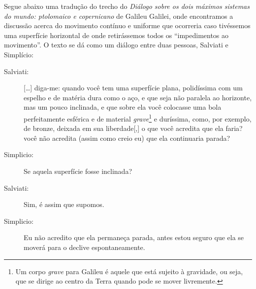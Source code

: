 Segue abaixo uma tradução do trecho do \emph{Diálogo sobre os dois máximos sistemas do mundo: ptolomaico e copernicano} de Galileu Galilei, onde encontramos a discussão acerca do movimento contínuo e uniforme que ocorreria caso tivéssemos uma superfície horizontal de onde retirássemos todos os ``impedimentos ao movimento''. O texto se dá como um diálogo entre duas pessoas, Salviati e  Simplício:
\begin{description}
\item[Salviati:] [\dots] diga-me: quando você tem uma superfície plana, polidíssima com um espelho e de matéria dura como o aço, e que seja não paralela ao horizonte, mas um pouco inclinada, e que sobre ela você colocasse uma bola perfeitamente esférica e de material \emph{grave}\footnote{Um corpo \emph{grave} para Galileu é aquele que está sujeito à gravidade, ou seja, que se dirige ao centro da Terra quando pode se mover livremente.} e duríssima, como, por exemplo, de bronze, deixada em sua liberdade[,] o que você acredita que  ela faria? você não acredita (assim como creio eu) que ela continuaria parada?

\item[Simplicio:] Se aquela superfície fosse inclinada?

\item[Salviati:] Sim, é assim que supomos.

\item[Simplicio:] Eu não acredito que ela permaneça parada, antes estou seguro que ela se moverá para o declive espontaneamente.


\end{description}
